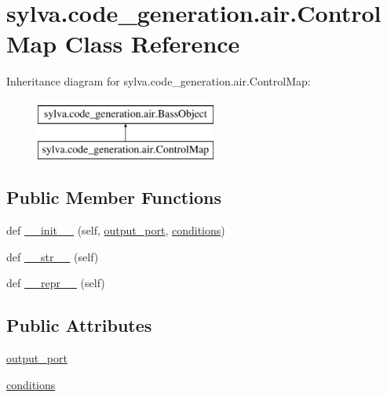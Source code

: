 \hypertarget{classsylva_1_1code__generation_1_1air_1_1_control_map}{}\section{sylva.\+code\+\_\+generation.\+air.\+Control\+Map Class Reference}
\label{classsylva_1_1code__generation_1_1air_1_1_control_map}
Inheritance diagram for sylva.\+code\+\_\+generation.\+air.\+Control\+Map\+:\begin{figure}[H]
\begin{center}
\leavevmode
\includegraphics[height=2.000000cm]{classsylva_1_1code__generation_1_1air_1_1_control_map}
\end{center}
\end{figure}
\subsection*{Public Member Functions}
\begin{DoxyCompactItemize}
\item 
def \hyperlink{classsylva_1_1code__generation_1_1air_1_1_control_map_a8b359dfc7d09c58ea64518d5cc69125c}{\+\_\+\+\_\+init\+\_\+\+\_\+} (self, \hyperlink{classsylva_1_1code__generation_1_1air_1_1_control_map_ab1eb2dd172ed3e35b4d93645aca8b340}{output\+\_\+port}, \hyperlink{classsylva_1_1code__generation_1_1air_1_1_control_map_ada7c102a2016403651c51193ba94dbc7}{conditions})
\item 
def \hyperlink{classsylva_1_1code__generation_1_1air_1_1_bass_object_a2c164720220479369c29db97b67aabe8}{\+\_\+\+\_\+str\+\_\+\+\_\+} (self)
\item 
def \hyperlink{classsylva_1_1code__generation_1_1air_1_1_bass_object_a17548b84b2a55240a429506aed418292}{\+\_\+\+\_\+repr\+\_\+\+\_\+} (self)
\end{DoxyCompactItemize}
\subsection*{Public Attributes}
\begin{DoxyCompactItemize}
\item 
\hyperlink{classsylva_1_1code__generation_1_1air_1_1_control_map_ab1eb2dd172ed3e35b4d93645aca8b340}{output\+\_\+port}
\item 
\hyperlink{classsylva_1_1code__generation_1_1air_1_1_control_map_ada7c102a2016403651c51193ba94dbc7}{conditions}
\end{DoxyCompactItemize}


